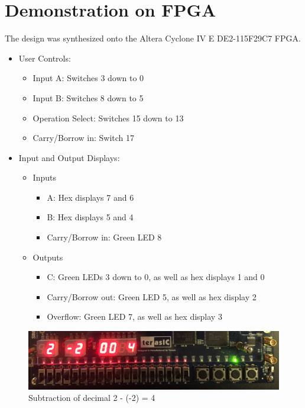 \documentclass[12pt]{article}
\begin{document}
\newpage

\section{Demonstration on FPGA} \label{demo}
The design was synthesized onto the Altera Cyclone IV E DE2-115F29C7 FPGA.
\begin{itemize}
\item User Controls:
	\begin{itemize}
	\item Input A: Switches 3 down to 0
	\item Input B: Switches 8 down to 5
	\item Operation Select: Switches 15 down to 13
	\item Carry/Borrow in: Switch 17
	\end{itemize}
\item Input and Output Displays:
	\begin{itemize}
	\item Inputs
		\begin{itemize}
		\item A: Hex displays 7 and 6
		\item B: Hex displays 5 and 4
		\item Carry/Borrow in: Green LED 8
		\end{itemize}
	\item Outputs
		\begin{itemize}
		\item C: Green LEDs 3 down to 0, as well as hex displays 1 and 0
		\item Carry/Borrow out: Green LED 5, as well as hex display 2
		\item Overflow: Green LED 7, as well as hex display 3
		\end{itemize}
	\end{itemize}
\end{itemize}

\begin{figure}[H]
\begin{center}
\includegraphics[scale=0.1]{example_subtraction.png}
\caption{Subtraction of decimal 2 - (-2) = 4}
\label{fig:boardsim0}
\end{center}
\end{figure}
\end{document}
